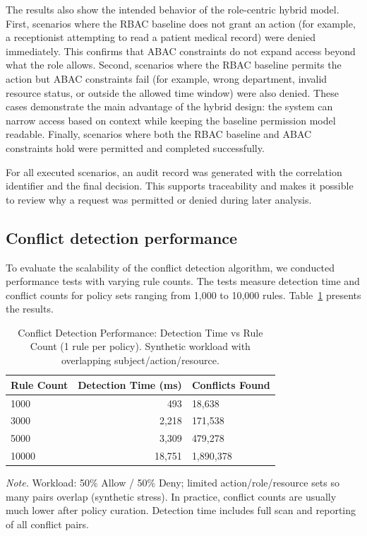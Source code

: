 The results also show the intended behavior of the role-centric hybrid model. First, scenarios where the RBAC baseline does
not grant an action (for example, a receptionist attempting to read a patient medical record) were denied immediately. This
confirms that ABAC constraints do not expand access beyond what the role allows. Second, scenarios where the RBAC baseline
permits the action but ABAC constraints fail (for example, wrong department, invalid resource status, or outside the allowed
time window) were also denied. These cases demonstrate the main advantage of the hybrid design: the system can narrow access
based on context while keeping the baseline permission model readable. Finally, scenarios where both the RBAC baseline and
ABAC constraints hold were permitted and completed successfully.
\vspace{0.5cm}


For all executed scenarios, an audit record was generated with the correlation identifier and the final decision. This
supports traceability and makes it possible to review why a request was permitted or denied during later analysis.



\subsection{ Conflict detection performance}
To evaluate the scalability of the conflict detection algorithm, we conducted performance tests with varying rule counts. The tests measure detection time and conflict counts for policy sets ranging from 1,000 to 10,000 rules. Table~\ref{tab:conflict-detection-performance} presents the results.

\begin{table}[H]
\centering
\begin{tabularx}{\textwidth}{|l|r|X|}
\hline
\textbf{Rule Count} & \textbf{Detection Time (ms)} & \textbf{Conflicts Found} \\
\hline
1000 & 493 & 18,638 \\
\hline
3000 & 2,218 & 171,538 \\
\hline
5000 & 3,309 & 479,278   \\
\hline
10000 & 18,751 & 1,890,378  \\
\hline
\end{tabularx}
\caption{Conflict Detection Performance: Detection Time vs Rule Count (1 rule per policy). Synthetic workload with overlapping subject/action/resource.}
\label{tab:conflict-detection-performance}
\medskip
\raggedright
\footnotesize
\textit{Note.} Workload: 50\% Allow / 50\% Deny; limited action/role/resource sets so many pairs overlap (synthetic stress). In practice, conflict counts are usually much lower after policy curation. Detection time includes full scan and reporting of all conflict pairs.
\end{table}

